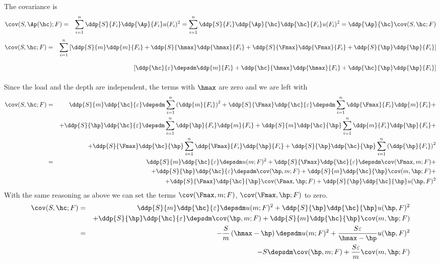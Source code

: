The covariance is
\begin{eqnarray*}
 \cov(S,\Ap(\hc);F) & =& \sum_{i=1}^n \ddp{ S}{ F_i} \ddp{ \Ap}{ F_i} u(F_i)^2 =  \sum_{i=1}^n \ddp{ S}{ F_i} \ddp{ \Ap}{ \hc} \ddp{\hc}{F_i} u(F_i)^2 =
 \ddp{\Ap}{\hc} \cov(S,\hc;F)
 \end{eqnarray*}
 \begin{eqnarray*}
\cov(S,\hc;F)  &=& \sum_{i=1}^n
  \left[ 
  \ddp{ S }{ m} \ddp{ m}{ F_i} + 
  \ddp{ S }{ \hmax} \ddp{ \hmax}{ F_i} + 
  \ddp{ S }{ \Fmax} \ddp{ \Fmax}{ F_i} + 
  \ddp{ S }{ \hp} \ddp{ \hp}{ F_i}
  \right]\\
  && \phantom{\sum_{i=1}^n}
  \left[
  \ddp{ \hc }{ \varepsilon} \depsdm \ddp{ m}{ F_i} + 
  \ddp{ \hc }{\hmax} \ddp{ \hmax}{ F_i} + 
  \ddp{ \hc }{ \hp} \ddp{ \hp}{ F_i} 
  \right]
  \end{eqnarray*}
  Since the load and the depth are independent, the terms with $\hmax$ are zero and we are left with
  \begin{eqnarray*}
  \cov(S,\hc;F) &=& 
  \ddp{ S }{ m} \ddp{ \hc }{ \varepsilon} \depsdm  \sum_{i=1}^n \left(\ddp{ m}{ F_i}\right)^2 +
  \ddp{ S }{ \Fmax} \ddp{ \hc }{ \varepsilon} \depsdm  \sum_{i=1}^n \ddp{ \Fmax}{ F_i}  \ddp{ m}{ F_i} + \\
  &&+
  \ddp{ S }{ \hp} \ddp{ \hc }{ \varepsilon} \depsdm  \sum_{i=1}^n \ddp{ \hp}{ F_i}  \ddp{ m}{ F_i} + 
  \ddp{ S }{ m} \ddp{ \hc }{ \hp}   \sum_{i=1}^n \ddp{ m}{ F_i} \ddp{ \hp}{ F_i} +  \\
  &&+
  \ddp{ S }{ \Fmax} \ddp{ \hc }{ \hp}  \sum_{i=1}^n \ddp{ \Fmax}{ F_i}  \ddp{ \hp}{ F_i} + 
  \ddp{ S }{ \hp} \ddp{ \hc }{ \hp}  \sum_{i=1}^n \left(\ddp{ \hp}{ F_i}\right)^2  \\
  &=&
  \ddp{ S }{ m} \ddp{ \hc }{ \varepsilon} \depsdm  u(m;F)^2 +
  \ddp{ S }{ \Fmax} \ddp{ \hc }{ \varepsilon} \depsdm  \cov(\Fmax,m; F) + \\
  &&+
  \ddp{ S }{ \hp} \ddp{ \hc }{ \varepsilon} \depsdm  \cov(\hp,m;F) + 
  \ddp{ S }{ m} \ddp{ \hc }{ \hp}  \cov(m,\hp;F) +  \\
  &&+
  \ddp{ S }{ \Fmax} \ddp{ \hc }{ \hp} \cov(\Fmax,\hp;F) + 
  \ddp{ S }{ \hp} \ddp{ \hc }{ \hp}  u(\hp,F)^2
  \end{eqnarray*}
With the same reasoning as above we can set the terms $\cov(\Fmax,m;F)$, $\cov(\Fmax, \hp;F)$ to zero.
 \begin{eqnarray*}
  \cov(S,\hc;F) 
  &=&
  \ddp{ S }{ m} \ddp{ \hc }{ \varepsilon} \depsdm  u(m;F)^2  +  \ddp{ S }{ \hp} \ddp{ \hc }{ \hp}  u(\hp,F)^2 \\
  &&+
  \ddp{ S }{ \hp} \ddp{ \hc }{ \varepsilon} \depsdm  \cov(\hp,m;F) + 
  \ddp{ S }{ m} \ddp{ \hc }{ \hp}  \cov(m,\hp;F) \\
  &=&
   - \frac{ S }{ m} \left(\hmax -\hp\right) \depsdm  u(m;F)^2  +  \frac{ S \varepsilon }{\hmax - \hp} u(\hp,F)^2 \\
  &&
  - S \depsdm  \cov(\hp,m;F) + \frac{ S \varepsilon}{ m}  \cov(m,\hp;F) 
  \end{eqnarray*}
